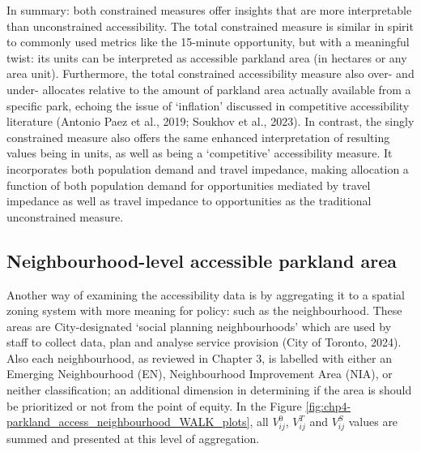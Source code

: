 \documentclass[
11pt, %
oneside, %
english, %
singlespacing, %
]{macthesis} %
\begin{document}
In summary: both constrained measures offer insights that are more interpretable than unconstrained accessibility. The total constrained measure is similar in spirit to commonly used metrics like the 15-minute opportunity, but with a meaningful twist: its units can be interpreted as accessible parkland area (in hectares or any area unit). Furthermore, the total constrained accessibility measure also over- and under- allocates relative to the amount of parkland area actually available from a specific park, echoing the issue of `inflation' discussed in competitive accessibility literature (Antonio Paez et al., 2019; Soukhov et al., 2023). In contrast, the singly constrained measure also offers the same enhanced interpretation of resulting values being in units, as well as being a `competitive' accessibility measure. It incorporates both population demand and travel impedance, making allocation a function of both population demand for opportunities mediated by travel impedance as well as travel impedance to opportunities as the traditional unconstrained measure.

\subsection{Neighbourhood-level accessible parkland area}\label{neighbourhood-level-accessible-parkland-area}

Another way of examining the accessibility data is by aggregating it to a spatial zoning system with more meaning for policy: such as the neighbourhood. These areas are City-designated `social planning neighbourhoods' which are used by staff to collect data, plan and analyse service provision (City of Toronto, 2024). Also each neighbourhood, as reviewed in Chapter 3, is labelled with either an Emerging Neighbourhood (EN), Neighbourhood Improvement Area (NIA), or neither classification; an additional dimension in determining if the area is should be prioritized or not from the point of equity. In the Figure \ref{fig:chp4-parkland_access_neighbourhood_WALK_plots}, all \(V^0_{ij}\), \(V^T_{ij}\) and \(V^S_{ij}\) values are summed and presented at this level of aggregation.
\end{document}
